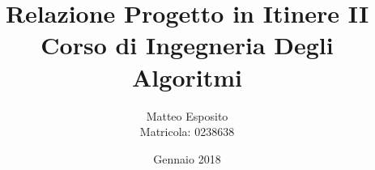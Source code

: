 \documentclass[10pt,a4paper,oneside]{matc3mem}
\begin{document}
\renewcommand\maketitlehooka{\null\mbox{}\vfill}
\renewcommand\maketitlehookd{\vfill\null}

\author{Matteo Esposito \\ Matricola: 0238638}
\title{Relazione Progetto in Itinere II \\
	\large Corso di Ingegneria Degli Algoritmi}
\date{Gennaio 2018}

\frontmatter
\begin{titlingpage}
\maketitle
\end{titlingpage}
\newpage
\tableofcontents

\mainmatter









\backmatter
\end{document}
